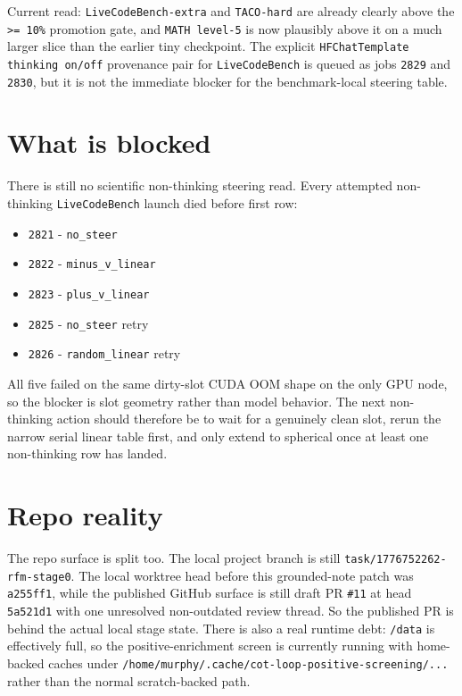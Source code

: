 \documentclass[11pt]{article}
\begin{document}
Current read: \texttt{LiveCodeBench-extra} and \texttt{TACO-hard} are already clearly above the \texttt{>= 10\%} promotion gate, and \texttt{MATH level-5} is now plausibly above it on a much larger slice than the earlier tiny checkpoint. The explicit \texttt{HFChatTemplate} \texttt{thinking on/off} provenance pair for \texttt{LiveCodeBench} is queued as jobs \texttt{2829} and \texttt{2830}, but it is not the immediate blocker for the benchmark-local steering table.

\section*{What is blocked}
There is still no scientific non-thinking steering read. Every attempted non-thinking \texttt{LiveCodeBench} launch died before first row:
\begin{itemize}
\item \texttt{2821} - \texttt{no\_steer}
\item \texttt{2822} - \texttt{minus\_v\_linear}
\item \texttt{2823} - \texttt{plus\_v\_linear}
\item \texttt{2825} - \texttt{no\_steer} retry
\item \texttt{2826} - \texttt{random\_linear} retry
\end{itemize}

All five failed on the same dirty-slot CUDA OOM shape on the only GPU node, so the blocker is slot geometry rather than model behavior. The next non-thinking action should therefore be to wait for a genuinely clean slot, rerun the narrow serial linear table first, and only extend to spherical once at least one non-thinking row has landed.

\section*{Repo reality}
The repo surface is split too. The local project branch is still \texttt{task/1776752262-rfm-stage0}. The local worktree head before this grounded-note patch was \texttt{a255ff1}, while the published GitHub surface is still draft PR \texttt{\#11} at head \texttt{5a521d1} with one unresolved non-outdated review thread. So the published PR is behind the actual local stage state. There is also a real runtime debt: \texttt{/data} is effectively full, so the positive-enrichment screen is currently running with home-backed caches under \texttt{/home/murphy/.cache/cot-loop-positive-screening/...} rather than the normal scratch-backed path.
\end{document}
